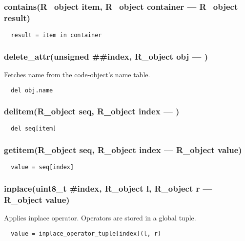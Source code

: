 \subsubsection{contains(R\_object item, R\_object container --- R\_object result)}
\vspace{-1em}\begin{verbatim}
  result = item in container
\end{verbatim}
\vspace{-1em}\vspace{-1em}
\subsubsection{delete\_attr(unsigned \#\#index, R\_object obj --- )}
\vspace{-1em}Fetches name from the code-object's name table. \vspace{-1em}\begin{verbatim}
  del obj.name
\end{verbatim}
\vspace{-1em}\vspace{-1em}
\subsubsection{delitem(R\_object seq, R\_object index --- )}
\vspace{-1em}\begin{verbatim}
  del seq[item]
\end{verbatim}
\vspace{-1em}\vspace{-1em}
\subsubsection{getitem(R\_object seq, R\_object index --- R\_object value)}
\vspace{-1em}\begin{verbatim}
  value = seq[index]
\end{verbatim}
\vspace{-1em}\vspace{-1em}
\subsubsection{inplace(uint8\_t \#index, R\_object l, R\_object r --- R\_object value)}
\vspace{-1em}Applies inplace operator. Operators are stored in a global tuple. \vspace{-1em}\begin{verbatim}
  value = inplace_operator_tuple[index](l, r)
\end{verbatim}
\vspace{-1em}\vspace{-1em}
